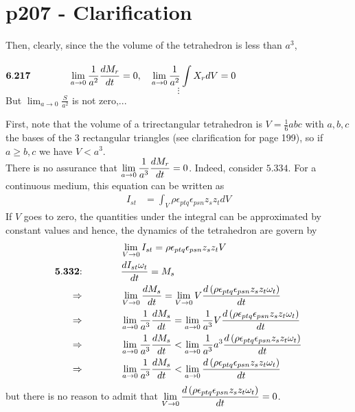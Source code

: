 \section{p207 - Clarification}
\begin{tcolorbox}
Then, clearly, since the the volume of the tetrahedron is less than $a^3$,\\\\
$\mathbf{6.217}\quad\quad\quad\quad \displaystyle \lim_{a \to 0} \frac{1}{a^2} \dv{M_r}{t}=0,\quad \displaystyle \lim_{a \to 0} \frac{1}{a^2} \int X_rdV=0$
$$\vdots$$
But  $\displaystyle \lim_{a \to 0} \frac{S}{a^2}$ is not zero,...
\end{tcolorbox}
First, note that the volume of  a trirectangular tetrahedron is $V=\frac{1}{6}abc$ with $a,b,c$ the bases of the 3 rectangular triangles (see clarification for page 199), so if $a\ge b,c$ we have  $V< a^3$.\\
There is no assurance that $\displaystyle \lim_{a \to 0} \frac{1}{a^3} \dv{M_r}{t}=0$. Indeed, consider $\mathbf{5.334}$. For a continuous medium, this equation can be written as
\begin{align}
I_{st} &= \int_{V}\rho\epsilon_{ptq}\epsilon_{psn}z_sz_tdV
\end{align} 
If $V$ goes to zero, the quantities under the integral can be approximated by constant values and hence, the dynamics of the tetrahedron are govern by
\begin{align}
&\displaystyle \lim_{V \to 0}I_{st} = \rho\epsilon_{ptq}\epsilon_{psn}z_sz_t V\\
\mathbf{5.332}\text{:}\quad\quad\quad\quad &\dv{I_{st}\omega_t}{t}= M_s\\
\Rightarrow\quad\quad\quad\quad &\lim_{V \to 0} \dv{M_s}{t} = \lim_{V \to 0}V\dv{\left(\rho\epsilon_{ptq}\epsilon_{psn}z_sz_t\omega_t\right)}{t} \\
\Rightarrow\quad\quad\quad\quad &\lim_{a \to 0} \frac{1}{a^3}\dv{M_s}{t} = \lim_{a \to 0}\frac{1}{a^3}V\dv{\left(\rho\epsilon_{ptq}\epsilon_{psn}z_sz_t\omega_t\right)}{t} \\
\Rightarrow\quad\quad\quad\quad &\lim_{a \to 0} \frac{1}{a^3}\dv{M_s}{t} < \lim_{a \to 0}\frac{1}{a^3}a^3\dv{\left(\rho\epsilon_{ptq}\epsilon_{psn}z_sz_t\omega_t\right)}{t} \\
\Rightarrow\quad\quad\quad\quad &\lim_{a \to 0} \frac{1}{a^3}\dv{M_s}{t} < \lim_{a \to 0}\dv{\left(\rho\epsilon_{ptq}\epsilon_{psn}z_sz_t\omega_t\right)}{t}
\end{align}
but there is no reason to admit that $\displaystyle \lim_{V \to 0}\dv{\left(\rho\epsilon_{ptq}\epsilon_{psn}z_sz_t\omega_t\right)}{t}=0$. \\
